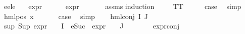 \begin{isabellebody}
\isamarkupfalse%
%
\endisatagproof
{\isafoldproof}%
%
\isadelimproof
\isanewline
%
\endisadelimproof
\isanewline
{}\isamarkupfalse%
\ e{}{\isacharunderscore}{\kern0pt}e{}{\isacharunderscore}{\kern0pt}le{\isacharunderscore}{\kern0pt}{}{\isacharcolon}{\kern0pt}\isanewline
\ \ \ {\isachardoublequoteopen}expr{\isacharunderscore}{\kern0pt}{}\ {\isasymphi}\ {\isasymle}\ {}{\isachardoublequoteclose}\isanewline
\ \ \ {\isachardoublequoteopen}expr{\isacharunderscore}{\kern0pt}{}\ {\isasymphi}\ {\isasymle}\ {}{\isachardoublequoteclose}\isanewline
%
\isadelimproof
\ \ %
\endisadelimproof
%
\isatagproof
{}\isamarkupfalse%
\ assms\isanewline
{}\isamarkupfalse%
{\isacharparenleft}{\kern0pt}induction\ {\isasymphi}{\isacharparenright}{\kern0pt}\isanewline
\ \ \isamarkupfalse%
\ TT\isanewline
\ \ \isamarkupfalse%
\ \isamarkupfalse%
\ {\isacharquery}{\kern0pt}case\ \isamarkupfalse%
\ simp\isanewline
{}\isamarkupfalse%
\isanewline
\ \ \isamarkupfalse%
\ {\isacharparenleft}{\kern0pt}hml{\isacharunderscore}{\kern0pt}pos\ x{}\ {\isasymphi}{\isacharparenright}{\kern0pt}\isanewline
\ \ \isamarkupfalse%
\ \isamarkupfalse%
\ {\isacharquery}{\kern0pt}case\ \isamarkupfalse%
\ simp\isanewline
{}\isamarkupfalse%
\isanewline
\ \ \isamarkupfalse%
\ {\isacharparenleft}{\kern0pt}hml{\isacharunderscore}{\kern0pt}conj\ I\ J\ {\isasymPhi}{\isacharparenright}{\kern0pt}\isanewline
\ \ \isamarkupfalse%
\ sup{\isacharcolon}{\kern0pt}\ {\isachardoublequoteopen}{\isacharparenleft}{\kern0pt}Sup\ {\isacharparenleft}{\kern0pt}{\isacharparenleft}{\kern0pt}expr{\isacharunderscore}{\kern0pt}{}\ {\isasymcirc}\ {\isasymPhi}{\isacharparenright}{\kern0pt}\ {\isacharbackquote}{\kern0pt}\ I\ {\isasymunion}\ {\isacharparenleft}{\kern0pt}{\isacharparenleft}{\kern0pt}eSuc\ {\isasymcirc}\ expr{\isacharunderscore}{\kern0pt}{}\ {\isasymcirc}\ {\isasymPhi}{\isacharparenright}{\kern0pt}\ {\isacharbackquote}{\kern0pt}\ J{\isacharparenright}{\kern0pt}{\isacharparenright}{\kern0pt}{\isacharparenright}{\kern0pt}\ {\isasymle}\ {}{\isachardoublequoteclose}\isanewline
\ \ \ \ \isamarkupfalse%
\ expr{\isacharunderscore}{\kern0pt}{}{\isacharunderscore}{\kern0pt}conj\ \isamarkupfalse%

\end{isabellebody}
